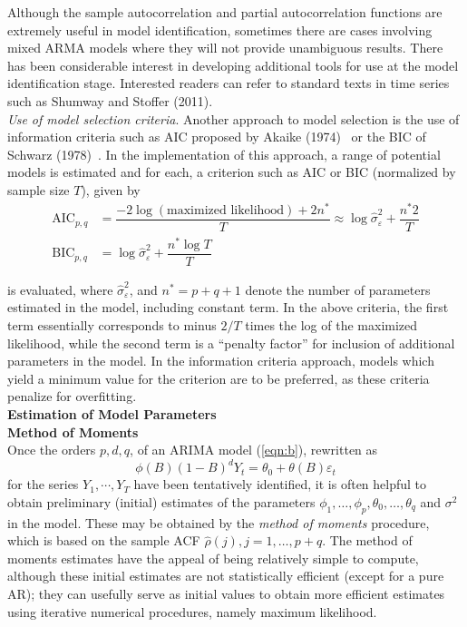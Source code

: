 Although the sample autocorrelation and partial autocorrelation functions are extremely useful in model identification, sometimes there are cases involving mixed ARMA models where they will not provide unambiguous results. There has been considerable interest in developing additional tools for use at the model identification stage. Interested readers can refer to standard texts in time series such as Shumway and Stoffer (2011)\cite{shumway2011arima}. \\


\noindent\textit{Use of model selection criteria}. Another approach to model selection is the use of information criteria such as AIC proposed by Akaike (1974)~\cite{akaike74} or the BIC of Schwarz (1978)~\cite{sch78}. In the implementation of this approach, a range of potential models is estimated and for each, a criterion such as AIC or BIC (normalized by sample size $T$), given by
	\begin{equation}\label{eqn:aicbic}
	\begin{split}
	\text{AIC}_{p,q}&=\dfrac{-2\log(\text{maximized likelihood})+2n^*}{T} \approx \log \hat{\sigma}_\varepsilon^2 + \dfrac{n^*2}{T} \\
	\text{BIC}_{p,q}&=\log\hat{\sigma}_\varepsilon^2 + \dfrac{n^*\log T}{T} 
	\end{split}
	\end{equation}

is evaluated, where $\hat{\sigma}_\varepsilon^2$, and $n^*=p+q+1$ denote the number of parameters estimated in the model, including constant term. In the above criteria, the first term essentially corresponds to minus $2/T$ times the log of the maximized likelihood, while the second term is a ``penalty factor'' for inclusion of additional parameters in the model. In the information criteria approach, models which yield a minimum value for the criterion are to be preferred, as these criteria penalize for overfitting. \\


\noindent\textbf{Estimation of Model Parameters} \\

\noindent \textbf{Method of Moments} \\


Once the orders $p,d,q$, of an ARIMA model (\ref{eqn:b}), rewritten as 
	\begin{equation}\label{eqn:phiB}
	\phi(B)(1 - B)^dY_t = \theta_0 + \theta(B)\varepsilon_t
	\end{equation}
for the series $Y_1,\cdots,Y_T$ have been tentatively identified, it is often helpful to obtain preliminary (initial) estimates of the parameters $\phi_1,\ldots,\phi_p,\theta_0,\ldots,\theta_q$ and $\sigma^2$ in the model. These may be obtained by the \textit{method of moments} procedure, which is based on the sample ACF $\hat{\rho}(j),j=1,\ldots,p+q$. The method of moments estimates have the appeal of being relatively simple to compute, although these initial estimates are not statistically efficient (except for a pure AR); they can usefully serve as initial values to obtain more efficient estimates using iterative numerical procedures, namely maximum likelihood.


